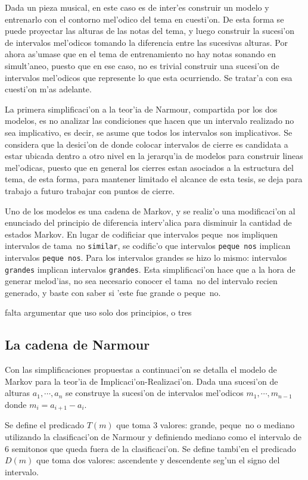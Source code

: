 Dada un pieza musical, en este caso es de inter'es construir un modelo y entrenarlo con el contorno mel'odico del tema en cuesti'on. De esta forma se puede proyectar
las alturas de las notas del tema, y luego construir la sucesi'on de intervalos mel'odicos tomando la diferencia entre las sucesivas alturas. Por ahora as'umase que 
en el tema de entrenamiento no hay notas sonando en simult'aneo, puesto que en ese caso, no es trivial construir una sucesi'on de intervalos mel'odicos que represente
lo que esta ocurriendo. Se tratar'a con esa cuesti'on m'as adelante.

La primera simplificaci'on a la teor'ia de Narmour, compartida por los dos modelos, es no analizar las condiciones que hacen que un intervalo realizado
no sea implicativo, es decir, se asume que todos los intervalos son implicativos. Se considera que la desici'on de donde colocar intervalos de cierre es candidata 
a estar ubicada dentro a otro nivel en la jerarqu'ia de modelos para construir lineas mel'odicas, puesto que en general los cierres estan asociados a la estructura
del tema, de esta forma, para mantener limitado el alcance de esta tesis, se deja para trabajo a futuro trabajar con puntos de cierre.

Uno de los modelos es una cadena de Markov, y se realiz'o una modificaci'on al enunciado del principio de diferencia interv'alica para disminuir la cantidad
de estados Markov. En lugar de codificiar que intervalos peque~nos impliquen intervalos de tama~no \texttt{similar}, se codific'o que 
intervalos \texttt{peque~nos} implican intervalos \texttt{peque~nos}. Para los intervalos grandes se hizo lo mismo: intervalos \texttt{grandes} implican 
intervalos \texttt{grandes}. Esta simplificaci'on hace que a la hora de generar melod'ias, no sea necesario conocer el tama~no del intervalo recien generado, y baste 
con saber si 'este fue grande o peque~no.

\alert{falta argumentar que uso solo dos principios, o tres}
\subsection{La cadena de Narmour}
\label{sec:markov_narmour}
Con las simplificaciones propuestas a continuaci'on se detalla el modelo de Markov para la teor'ia de Implicaci'on-Realizaci'on.
Dada una sucesi'on de alturas $a_1, \cdots, a_n$ se construye la sucesi'on de intervalos mel'odicos $m_1, \cdots, m_{n-1}$ donde $m_i = a_{i+1}-a_i$. 

Se define el predicado $T(m)$ que toma 3 valores: grande, peque~no o mediano utilizando la clasificaci'on de Narmour y definiendo mediano como el intervalo de 
6 semitonos que queda fuera de la clasificaci'on. Se define tambi'en el predicado $D(m)$ que toma dos valores: ascendente y descendente seg'un el signo del intervalo.

